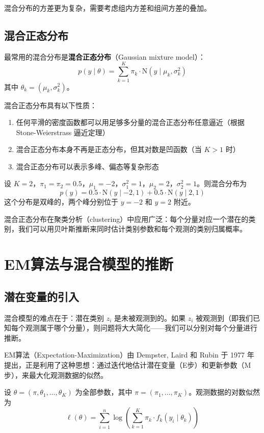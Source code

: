 混合分布的方差更为复杂，需要考虑组内方差和组间方差的叠加。

\subsection{混合正态分布}

最常用的混合分布是\textbf{混合正态分布}（Gaussian mixture model）：
\[
p(y \mid \theta) = \sum_{k=1}^{K} \pi_k \cdot \mathrm{N}(y \mid \mu_k, \sigma_k^2)
\]
其中 $\theta_k = (\mu_k, \sigma_k^2)$。

混合正态分布具有以下性质：
\begin{enumerate}
  \item 任何平滑的密度函数都可以用足够多分量的混合正态分布任意逼近（根据 Stone-Weierstrass 逼近定理）
  \item 混合正态分布本身不再是正态分布，但其对数是凹函数（当 $K > 1$ 时）
  \item 混合正态分布可以表示多峰、偏态等复杂形态
\end{enumerate}

\begin{Example}[双正态混合]
  设 $K=2$，$\pi_1 = \pi_2 = 0.5$，$\mu_1 = -2$，$\sigma_1^2 = 1$，$\mu_2 = 2$，$\sigma_2^2 = 1$。则混合分布为
  \[
  p(y) = 0.5 \cdot \mathrm{N}(y \mid -2, 1) + 0.5 \cdot \mathrm{N}(y \mid 2, 1)
  \]
  这个分布是双峰的，两个峰分别位于 $y = -2$ 和 $y = 2$ 附近。
\end{Example}

混合正态分布在聚类分析（clustering）中应用广泛：每个分量对应一个潜在的类别，我们可以用贝叶斯推断来同时估计类别参数和每个观测的类别归属概率。

\section{EM算法与混合模型的推断}

\subsection{潜在变量的引入}

混合模型的难点在于：潜在类别 $z_i$ 是未被观测到的。如果 $z_i$ 被观测到（即我们已知每个观测属于哪个分量），则问题将大大简化——我们可以分别对每个分量进行推断。

EM算法（Expectation-Maximization）由 Dempster, Laird 和 Rubin \cite{Dempster1977} 于 1977 年提出，正是利用了这种思想：通过迭代地估计潜在变量（E步）和更新参数（M步），来最大化观测数据的似然。

设 $\theta = (\pi, \theta_1, \ldots, \theta_K)$ 为全部参数，其中 $\pi = (\pi_1, \ldots, \pi_K)$。观测数据的对数似然为
\[
\ell(\theta) = \sum_{i=1}^{n} \log \left( \sum_{k=1}^{K} \pi_k \cdot f_k(y_i \mid \theta_k) \right)
\]

